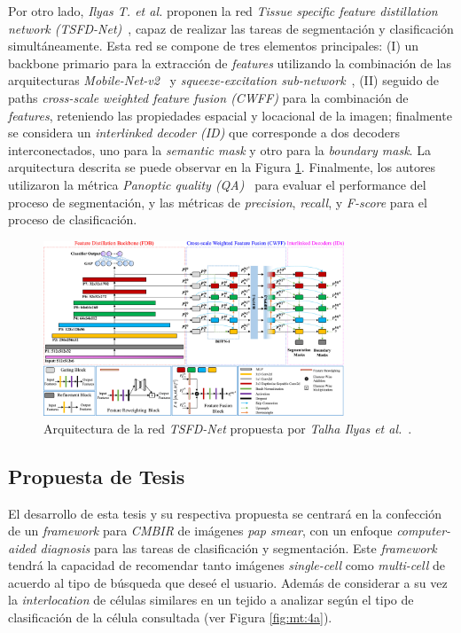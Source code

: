 \documentclass[10pt]{article}
\begin{document}
Por otro lado, \textit{Ilyas T. et al.} proponen la red \textit{Tissue specific feature distillation network (TSFD-Net)}~\cite{Ilyas2022}, capaz de realizar las tareas de segmentación y clasificación simultáneamente. Esta red se compone de tres elementos principales: (I) un backbone primario para la extracción de \textit{features} utilizando la combinación de las arquitecturas \textit{Mobile-Net-v2}~\cite{10.48550/arxiv.1801.04381} y \textit{squeeze-excitation sub-network}~\cite{8578843}, (II) seguido de paths \textit{cross-scale weighted feature fusion (CWFF)} para la combinación de \textit{features}, reteniendo las propiedades espacial y locacional de la imagen; finalmente se considera un \textit{interlinked decoder (ID)} que corresponde a dos decoders interconectados, uno para la \textit{semantic mask} y otro para la \textit{boundary mask}. La arquitectura descrita se puede observar en la Figura \ref{fig:mt:3a}. Finalmente, los autores utilizaron la métrica \textit{Panoptic quality (QA)}~\cite{GRAHAM2019101563, 10.1007/978-3-030-23937-4_2} para evaluar el performance del proceso de segmentación, y las métricas de \textit{precision}, \textit{recall}, y  \textit{F-score} para el proceso de clasificación.
\begin{figure}
    \centering
    \includegraphics[width=0.8\textwidth]{img/1-s2.0-S0893608022000612-gr3_lrg.jpg}
    \caption{Arquitectura de la red \textit{TSFD-Net} propuesta por \textit{Talha Ilyas et al.}~\cite{Ilyas2022}.}
    \label{fig:mt:3a}
\end{figure}


\subsection{Propuesta de Tesis}
El desarrollo de esta tesis y su respectiva propuesta se centrará en la confección de un \textit{framework} para \textit{CMBIR} de imágenes \textit{pap smear}, con un enfoque \textit{computer-aided diagnosis} para las tareas de clasificación y segmentación. Este \textit{framework} tendrá la capacidad de recomendar tanto imágenes \textit{single-cell} como \textit{multi-cell} de acuerdo al tipo de búsqueda que deseé el usuario. Además de considerar a su vez la \textit{interlocation} de células similares en un tejido a analizar según el tipo de clasificación de la célula consultada (ver Figura \ref{fig:mt:4a}).\\
\end{document}

